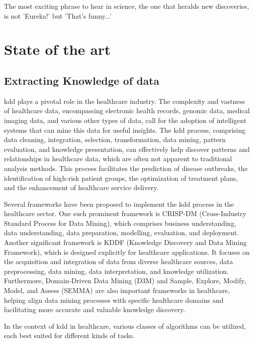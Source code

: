 \begin{savequote}[75mm]
The most exciting phrase to hear in science, the one that heralds new discoveries, is not 'Eureka!' but 'That's funny...'
\end{savequote}

\chapter{State of the art} \label{chap:sota}

\section{Extracting Knowledge of data}\label{sec:kdd}
\ac{kdd} plays a pivotal role in the healthcare industry. The complexity and vastness of healthcare data, encompassing electronic health records, genomic data, medical imaging data, and various other types of data, call for the adoption of intelligent systems that can mine this data for useful insights. The \ac{kdd} process, comprising data cleaning, integration, selection, transformation, data mining, pattern evaluation, and knowledge presentation, can effectively help discover patterns and relationships in healthcare data, which are often not apparent to traditional analysis methods. This process facilitates the prediction of disease outbreaks, the identification of high-risk patient groups, the optimization of treatment plans, and the enhancement of healthcare service delivery.

Several frameworks have been proposed to implement the \ac{kdd} process in the healthcare sector. One such prominent framework is CRISP-DM (Cross-Industry Standard Process for Data Mining), which comprises business understanding, data understanding, data preparation, modelling, evaluation, and deployment. Another significant framework is KDDF (Knowledge Discovery and Data Mining Framework), which is designed explicitly for healthcare applications. It focuses on the acquisition and integration of data from diverse healthcare sources, data preprocessing, data mining, data interpretation, and knowledge utilization. Furthermore, Domain-Driven Data Mining (D3M) and Sample, Explore, Modify, Model, and Assess (SEMMA) are also important frameworks in healthcare, helping align data mining processes with specific healthcare domains and facilitating more accurate and valuable knowledge discovery.

In the context of \ac{kdd} in healthcare, various classes of algorithms can be utilized, each best suited for different kinds of tasks.

